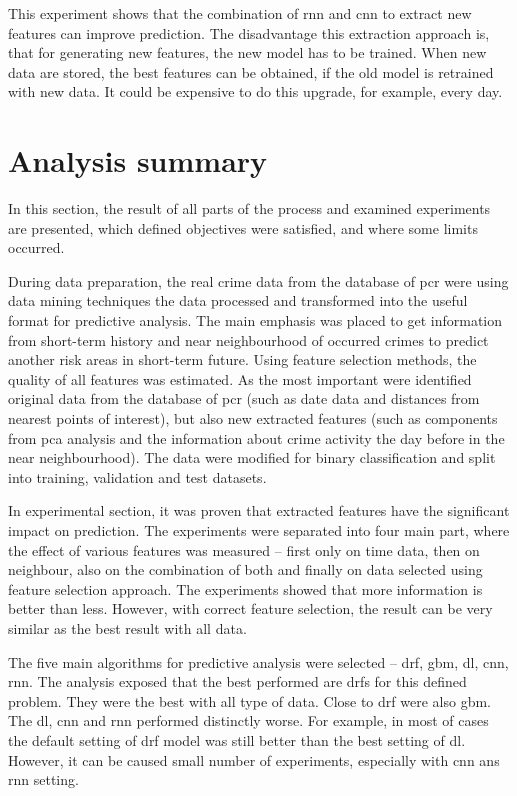 \documentclass[thesis=M,english]{FITthesis}[2012/10/20]
\begin{document}
This experiment shows that the combination of \gls{rnn} and \gls{cnn} to extract new features can improve prediction. The disadvantage this extraction approach is, that for generating new features, the new model has to be trained. When new data are stored, the best features can be obtained, if the old model is retrained with new data. It could be expensive to do this upgrade, for example, every day. 

\section{Analysis summary}

In this section, the result of all parts of the process and examined experiments are presented, which defined objectives were satisfied, and where some limits occurred.

During data preparation, the real crime data from the database of \gls{pcr} were using data mining techniques the data processed and transformed into the useful format for predictive analysis. The main emphasis was placed to get information from short-term history and near neighbourhood of occurred crimes to predict another risk areas in short-term future. Using feature selection methods, the quality of all features was estimated. As the most important were identified original data from the database of \gls{pcr} (such as date data and distances from nearest points of interest), but also new extracted features (such as components from \gls{pca} analysis and the information about crime activity the day before in the near neighbourhood). The data were modified for binary classification and split into training, validation and test datasets. 

In experimental section, it was proven that extracted features have the significant impact on prediction. The experiments were separated into four main part, where the effect of various features was measured -- first only on time data, then on neighbour, also on the combination of both and finally on data selected using feature selection approach. The experiments showed that more information is better than less. However, with correct feature selection, the result can be very similar as the best result with all data. 

The five main algorithms for predictive analysis were selected -- \gls{drf}, \gls{gbm}, \gls{dl}, \gls{cnn}, \gls{rnn}. The analysis exposed that the best performed are \gls{drf}s for this defined problem. They were the best with all type of data. Close to \gls{drf} were also \gls{gbm}. The \gls{dl}, \gls{cnn} and \gls{rnn} performed distinctly worse. For example, in most of cases the default setting of \gls{drf} model was still better than the best setting of \gls{dl}. However, it can be caused small number of experiments, especially with \gls{cnn} ans \gls{rnn} setting.
\end{document}
